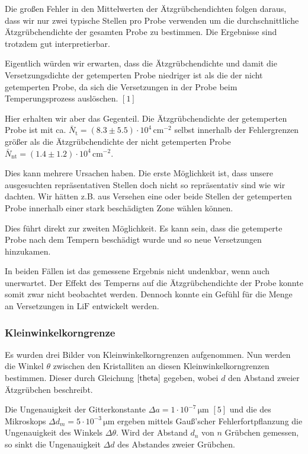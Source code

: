 \documentclass[12pt,a4paper]{scrartcl}
\numberwithin{equation}{section} %
\renewcommand{\[}{} %
\renewcommand{\]}{\noindent} %
\begin{document}
Die großen Fehler in den Mittelwerten der Ätzgrübchendichten folgen
daraus, dass wir nur zwei typische Stellen pro Probe verwenden um die
durchschnittliche Ätzgrübchendichte der gesamten Probe zu bestimmen. Die
Ergebnisse sind trotzdem gut interpretierbar.

Eigentlich würden wir erwarten, dass die Ätzgrübchendichte und damit die
Versetzungsdichte der getemperten Probe niedriger ist als die der nicht
getemperten Probe, da sich die Versetzungen in der Probe beim
Temperungsprozess auslöschen. \([1]\)

Hier erhalten wir aber das Gegenteil. Die Ätzgrübchendichte der
getemperten Probe ist mit ca.
\(\bar N_\mathrm{t}=(8.3\pm 5.5) \cdot 10^4 \mathrm{\, cm^{-2}}\) selbst
innerhalb der Fehlergrenzen größer als die Ätzgrübchendichte der nicht
getemperten Probe
\(\bar N_\mathrm{nt}=(1.4 \pm 1.2) \cdot 10^4 \mathrm{\, cm^{-2}}\).

Dies kann mehrere Ursachen haben. Die erste Möglichkeit ist, dass unsere
ausgesuchten repräsentativen Stellen doch nicht so repräsentativ sind
wie wir dachten. Wir hätten z.B. aus Versehen eine oder beide Stellen
der getemperten Probe innerhalb einer stark beschädigten Zone wählen
können.

Dies führt direkt zur zweiten Möglichkeit. Es kann sein, dass die
getemperte Probe nach dem Tempern beschädigt wurde und so neue
Versetzungen hinzukamen.

In beiden Fällen ist das gemessene Ergebnis nicht undenkbar, wenn auch
unerwartet. Der Effekt des Temperns auf die Ätzgrübchendichte der Probe
konnte somit zwar nicht beobachtet werden. Dennoch konnte ein Gefühl für
die Menge an Versetzungen in \(\mathrm{LiF}\) entwickelt werden.

\hypertarget{kleinwinkelkorngrenze}{%
\subsubsection{Kleinwinkelkorngrenze}\label{kleinwinkelkorngrenze}}

Es wurden drei Bilder von Kleinwinkelkorngrenzen aufgenommen. Nun werden
die Winkel \(\theta\) zwischen den Kristalliten an diesen
Kleinwinkelkorngrenzen bestimmen. Dieser durch Gleichung
\(\eqref{theta}\) gegeben, wobei \(d\) den Abstand zweier Ätzgrübchen
beschreibt.

Die Ungenauigkeit der Gitterkonstante
\(\Delta a=1 \cdot 10^{-7} \mathrm{\, \mu m}\) \([5]\) und die des
Mikroskops \(\Delta d_m = 5 \cdot 10^{-3} \mathrm{\, \mu m}\) ergeben
mittels Gauß'scher Fehlerfortpflanzung die Ungenauigkeit des Winkels
\(\Delta \theta\). Wird der Abstand \(d_n\) von \(n\) Grübchen gemessen,
so sinkt die Ungenauigkeit \(\Delta d\) des Abstandes zweier Grübchen.
\end{document}
